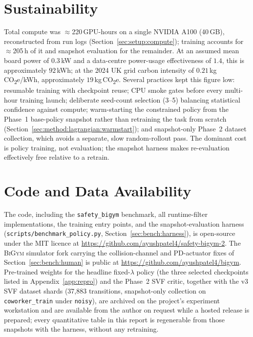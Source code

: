 \documentclass[11pt,a4paper]{report}
\newcommand{\bigym}{\textsc{BiGym}}
\newcommand{\sbigym}{\texttt{safety\_bigym}}
\begin{document}
\chapter{Sustainability}
\label{app:sustainability}

Total compute was $\approx$220\,GPU-hours on a single NVIDIA A100
(40\,GB), reconstructed from run logs
(Section~\ref{sec:setup:compute}); training accounts for
$\approx$205\,h of it and snapshot evaluation for the remainder. At an
assumed mean board power of $0.3$\,kW and a data-centre
power-usage effectiveness of $1.4$, this is approximately $92$\,kWh;
at the 2024 UK grid carbon intensity of
$0.21$\,kg\,CO\textsubscript{2}e/kWh, approximately
$19$\,kg\,CO\textsubscript{2}e. Several practices kept this figure low: resumable
training with checkpoint reuse; CPU smoke gates before every multi-hour
training launch; deliberate seed-count selection (3--5) balancing
statistical confidence against compute; warm-starting the constrained
policy from the Phase~1 base-policy snapshot rather than retraining the
task from scratch (Section~\ref{sec:method:lagrangian:warmstart}); and
snapshot-only Phase~2 dataset collection, which avoids a separate, slow
random-rollout pass. The dominant cost is policy training, not
evaluation; the snapshot harness makes re-evaluation effectively free
relative to a retrain.

\chapter{Code and Data Availability}
\label{app:data}

The code, including the \sbigym{} benchmark, all runtime-filter
implementations, the training entry points, and the
snapshot-evaluation harness
(\texttt{scripts/benchmark\_policy.py},
Section~\ref{sec:bench:harness}), is open-source under the MIT
licence at \url{https://github.com/ayushpatel4/safety-bigym-2}. The
\bigym{} simulator fork carrying the collision-channel and
PD-actuator fixes of Section~\ref{sec:bench:human} is public at
\url{https://github.com/ayushpatel4/bigym}. Pre-trained weights for
the headline fixed-$\lambda$ policy (the three selected checkpoints
listed in Appendix~\ref{app:repro}) and the Phase~2 SVF critic,
together with the v3 SVF dataset shards (37{,}883 transitions,
snapshot-only collection on \texttt{coworker\_train} under
\texttt{noisy}), are archived on the project's experiment
workstation and are available from the author on request while a
hosted release is prepared; every quantitative table in this report
is regenerable from those snapshots with the harness, without any
retraining.


\end{document}

